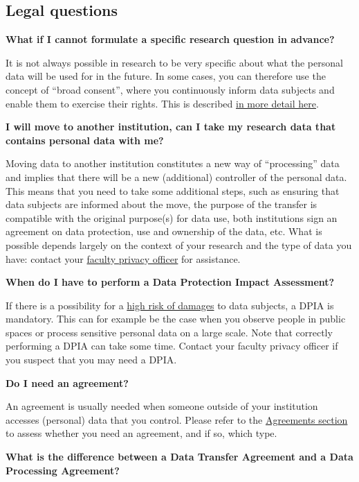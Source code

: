 \documentclass[
]{book}
\begin{document}
\hypertarget{legal}{%
\subsection{Legal questions}\label{legal}}

\textbf{What if I cannot formulate a specific research question in advance?}

It is not always possible in research to be very specific about what the personal data will be used for in the future. In some cases, you can therefore use the concept of ``broad consent'', where you continuously inform data subjects and enable them to exercise their rights. This is described \protect\hyperlink{broad-consent}{in more detail here}.

\textbf{I will move to another institution, can I take my research data that contains personal data with me?}

Moving data to another institution constitutes a new way of ``processing'' data and implies that there will be a new (additional) controller of the personal data. This means that you need to take some additional steps, such as ensuring that data subjects are informed about the move, the purpose of the transfer is compatible with the original purpose(s) for data use, both institutions sign an agreement on data protection, use and ownership of the data, etc. What is possible depends largely on the context of your research and the type of data you have: contact your \href{https://intranet.uu.nl/en/knowledgebase/privacyofficers}{faculty privacy officer} for assistance.

\textbf{When do I have to perform a Data Protection Impact Assessment?}

If there is a possibility for a \protect\hyperlink{high-risk-processing}{high risk of damages} to data subjects, a DPIA is mandatory. This can for example be the case when you observe people in public spaces or process sensitive personal data on a large scale. Note that correctly performing a DPIA can take some time. Contact your faculty privacy officer if you suspect that you may need a DPIA.

\textbf{Do I need an agreement?}

An agreement is usually needed when someone outside of your institution accesses (personal) data that you control. Please refer to the \protect\hyperlink{agreements}{Agreements section} to assess whether you need an agreement, and if so, which type.

\textbf{What is the difference between a Data Transfer Agreement and a Data Processing Agreement?}
\end{document}
